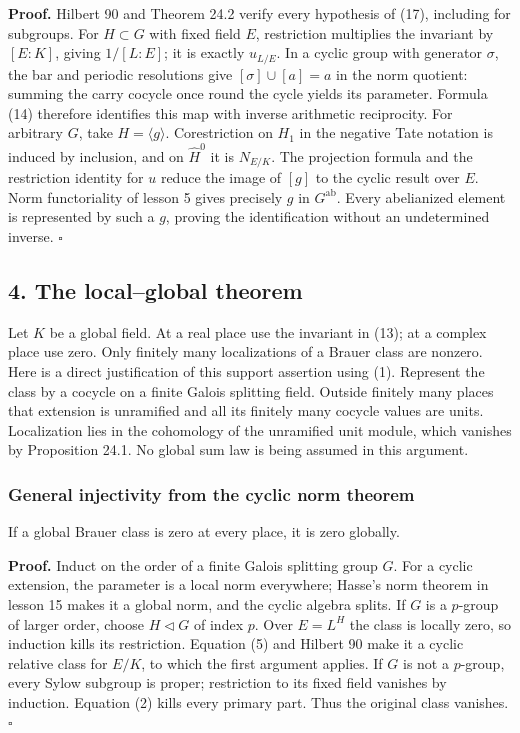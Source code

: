 \documentclass[11pt,a4paper]{article}
\begin{document}
\textbf{Proof.} Hilbert 90 and Theorem 24.2 verify every hypothesis of
(17), including for subgroups. For \(H\subset G\) with fixed field
\(E\), restriction multiplies the invariant by \([E:K]\), giving
\(1/[L:E]\); it is exactly \(u_{L/E}\). In a cyclic group with generator
\(\sigma\), the bar and periodic resolutions give \([\sigma]\cup[a]=a\)
in the norm quotient: summing the carry cocycle once round the cycle
yields its parameter. Formula (14) therefore identifies this map with
inverse arithmetic reciprocity. For arbitrary \(G\), take
\(H=\langle g\rangle\). Corestriction on \(H_1\) in the negative Tate
notation is induced by inclusion, and on \(\widehat H^0\) it is
\(N_{E/K}\). The projection formula and the restriction identity for
\(u\) reduce the image of \([g]\) to the cyclic result over \(E\). Norm
functoriality of lesson 5 gives precisely \(g\) in \(G^{\mathrm{ab}}\).
Every abelianized element is represented by such a \(g\), proving the
identification without an undetermined inverse. \(\square\)

\subsection{4. The local--global theorem}\label{the-localglobal-theorem}

Let \(K\) be a global field. At a real place use the invariant in (13);
at a complex place use zero. Only finitely many localizations of a
Brauer class are nonzero. Here is a direct justification of this support
assertion using (1). Represent the class by a cocycle on a finite Galois
splitting field. Outside finitely many places that extension is
unramified and all its finitely many cocycle values are units.
Localization lies in the cohomology of the unramified unit module, which
vanishes by Proposition 24.1. No global sum law is being assumed in this
argument.

\subsubsection{General injectivity from the cyclic norm
theorem}\label{general-injectivity-from-the-cyclic-norm-theorem}

If a global Brauer class is zero at every place, it is zero globally.

\textbf{Proof.} Induct on the order of a finite Galois splitting group
\(G\). For a cyclic extension, the parameter is a local norm everywhere;
Hasse's norm theorem in lesson 15 makes it a global norm, and the cyclic
algebra splits. If \(G\) is a \(p\)-group of larger order, choose
\(H\triangleleft G\) of index \(p\). Over \(E=L^H\) the class is locally
zero, so induction kills its restriction. Equation (5) and Hilbert 90
make it a cyclic relative class for \(E/K\), to which the first argument
applies. If \(G\) is not a \(p\)-group, every Sylow subgroup is proper;
restriction to its fixed field vanishes by induction. Equation (2) kills
every primary part. Thus the original class vanishes. \(\square\)
\end{document}
